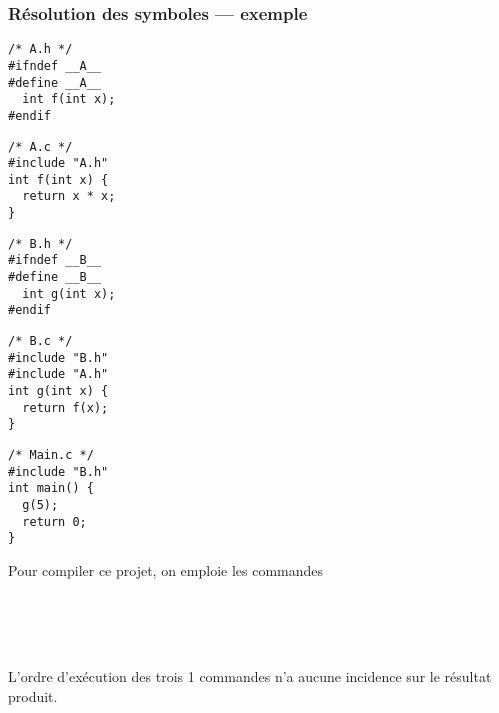 \begin{frame}[fragile]
\frametitle{Résolution des symboles --- exemple}
\begin{minipage}[c]{.18\textwidth}
\begin{lstlisting}[frame=single,numbers=none,basicstyle=\scriptsize\tt]
/* A.h */
#ifndef __A__
#define __A__
  int f(int x);
#endif
\end{lstlisting}
\end{minipage}
\enspace
\begin{minipage}[c]{.18\textwidth}
\begin{lstlisting}[frame=single,numbers=none,basicstyle=\scriptsize\tt]
/* A.c */
#include "A.h"
int f(int x) {
  return x * x;
}
\end{lstlisting}
\end{minipage}
\enspace
\begin{minipage}[c]{.18\textwidth}
\begin{lstlisting}[frame=single,numbers=none,basicstyle=\scriptsize\tt]
/* B.h */
#ifndef __B__
#define __B__
  int g(int x);
#endif
\end{lstlisting}
\end{minipage}
\enspace
\begin{minipage}[c]{.18\textwidth}
\begin{lstlisting}[frame=single,numbers=none,basicstyle=\scriptsize\tt]
/* B.c */
#include "B.h"
#include "A.h"
int g(int x) {
  return f(x);
}
\end{lstlisting}
\end{minipage}
\enspace
\begin{minipage}[c]{.17\textwidth}
\begin{lstlisting}[frame=single,numbers=none,basicstyle=\scriptsize\tt]
/* Main.c */
#include "B.h"
int main() {
  g(5);
  return 0;
}
\end{lstlisting}
\end{minipage}

Pour compiler ce projet, on emploie les commandes
\medskip

 \\
 \\
 \\
\bigskip

L'ordre d'exécution des trois 1\ieres{} commandes n'a aucune incidence
sur le résultat produit.
\end{frame}

